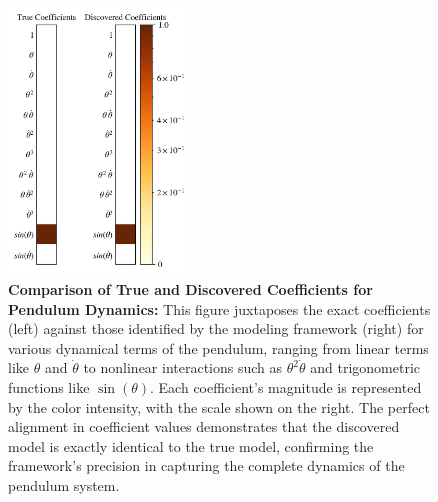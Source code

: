 


\begin{figure}[htbp]
    \centering
    \includegraphics[width=0.43\textwidth]{project_2/images/xi_plot_pendulum.png}
    \vspace{-3mm}
    \caption{\textbf{Comparison of True and Discovered Coefficients for Pendulum Dynamics:} This figure juxtaposes the exact coefficients (left) against those identified by the modeling framework (right) for various dynamical terms of the pendulum, ranging from linear terms like $\theta$ and $\dot{\theta}$ to nonlinear interactions such as $\theta^2\dot{\theta}$ and trigonometric functions like $\sin(\theta)$. Each coefficient's magnitude is represented by the color intensity, with the scale shown on the right. The perfect alignment in coefficient values demonstrates that the discovered model is exactly identical to the true model, confirming the framework's precision in capturing the complete dynamics of the pendulum system.}
    \label{fig:xi_plot_pendulum}
\end{figure}

